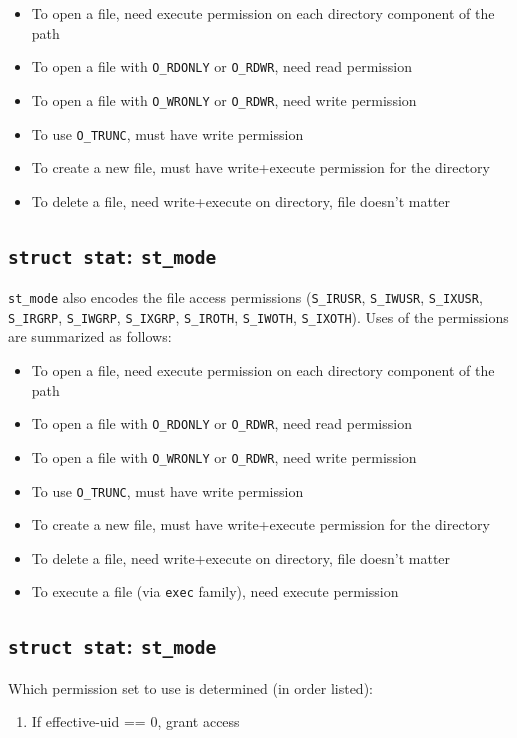 \documentclass[xga]{xdvislides}
\begin{document}
\begin{itemize}
	\item To open a file, need execute permission on each directory component of the path
	\item To open a file with {\tt O\_RDONLY} or {\tt O\_RDWR}, need read permission
	\item To open a file with {\tt O\_WRONLY} or {\tt O\_RDWR}, need write permission
	\item To use {\tt O\_TRUNC}, must have write permission
	\item To create a new file, must have write+execute permission for the directory
	\item To delete a file, need write+execute on directory, file doesn't matter
\end{itemize}


\subsection{{\tt struct stat}: {\tt st\_mode}}
{\tt st\_mode} also encodes the file access permissions ({\tt S\_IRUSR},
{\tt S\_IWUSR}, {\tt S\_IXUSR}, {\tt S\_IRGRP}, {\tt S\_IWGRP}, {\tt S\_IXGRP},
{\tt S\_IROTH}, {\tt S\_IWOTH}, {\tt S\_IXOTH}).  Uses of the permissions are
summarized as follows:

\begin{itemize}
	\item To open a file, need execute permission on each directory component of the path
	\item To open a file with {\tt O\_RDONLY} or {\tt O\_RDWR}, need read permission
	\item To open a file with {\tt O\_WRONLY} or {\tt O\_RDWR}, need write permission
	\item To use {\tt O\_TRUNC}, must have write permission
	\item To create a new file, must have write+execute permission for the directory
	\item To delete a file, need write+execute on directory, file doesn't matter
	\item To execute a file (via {\tt exec} family), need execute permission
\end{itemize}

\subsection{{\tt struct stat}: {\tt st\_mode}}
Which permission set to use is determined (in order listed):
\begin{enumerate}
	\item If effective-uid == 0, grant access
\end{enumerate}
\end{document}
